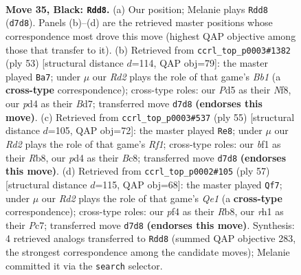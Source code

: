 \documentclass[11pt]{article}
\begin{document}
\clearpage

\begin{figure}[p]\centering
\begin{subfigure}{0.46\textwidth}\centering
\resizebox{\linewidth}{!}{%
\newchessgame
\chessboard[
  setfen={7r/pb1r1k1p/n1q3pP/1p1p1pP1/1b1P1P2/1P2P1N1/5K2/R2Q1BNR b - - 17 35},
  showmover=false,
  pgfstyle=straightmove, color=movearrow, markmove={d7-d8}
]}
\caption{}
\end{subfigure}\hfill
\begin{subfigure}{0.46\textwidth}\centering
\resizebox{\linewidth}{!}{%
\newchessgame
\chessboard[
  setfen={1b2rnk1/1pqb1p2/2p2pp1/p1P4p/P2PP2P/1Q3B2/1P2NKP1/3R3R b - - 1 27},
  showmover=false,
  pgfstyle=straightmove, color=movearrow, markmove={b8-a7}
]}
\caption{}
\end{subfigure}
\\[4pt]
\begin{subfigure}{0.46\textwidth}\centering
\resizebox{\linewidth}{!}{%
\newchessgame
\chessboard[
  setfen={1rb2r1k/2q3p1/2p2b1p/p3p1nP/P1B1Pp2/1P1N1P2/1BP1Q3/1K1R2R1 b - - 3 28},
  showmover=false,
  pgfstyle=straightmove, color=movearrow, markmove={f8-e8}
]}
\caption{}
\end{subfigure}\hfill
\begin{subfigure}{0.46\textwidth}\centering
\resizebox{\linewidth}{!}{%
\newchessgame
\chessboard[
  setfen={1r2q2k/2pn2rp/3bp1p1/pb1p2P1/p2P1PNQ/2P5/1PB3P1/R1B3KR b - - 11 29},
  showmover=false,
  pgfstyle=straightmove, color=movearrow, markmove={e8-f7}
]}
\caption{}
\end{subfigure}
\caption{\textbf{Move 35, Black: \texttt{Rdd8}.} (a) Our position; Melanie plays \texttt{Rdd8} (\texttt{d7d8}). Panels (b)--(d) are the retrieved master positions whose correspondence most drove this move (highest QAP objective among those that transfer to it). (b) Retrieved from \texttt{ccrl\_top\_p0003\#1382} (ply 53) [structural distance $d$=114, QAP obj=79]: the master played \texttt{Ba7}; under $\mu$ our \emph{Rd2} plays the role of that game's \emph{Bb1} (a \textbf{cross-type} correspondence); cross-type roles: our \emph{P}d5 as their \emph{N}f8, our \emph{p}d4 as their \emph{B}d7; transferred move \texttt{d7d8} \textbf{(endorses this move)}. (c) Retrieved from \texttt{ccrl\_top\_p0003\#537} (ply 55) [structural distance $d$=105, QAP obj=72]: the master played \texttt{Re8}; under $\mu$ our \emph{Rd2} plays the role of that game's \emph{Rf1}; cross-type roles: our \emph{b}f1 as their \emph{R}b8, our \emph{p}d4 as their \emph{B}c8; transferred move \texttt{d7d8} \textbf{(endorses this move)}. (d) Retrieved from \texttt{ccrl\_top\_p0002\#105} (ply 57) [structural distance $d$=115, QAP obj=68]: the master played \texttt{Qf7}; under $\mu$ our \emph{Rd2} plays the role of that game's \emph{Qe1} (a \textbf{cross-type} correspondence); cross-type roles: our \emph{p}f4 as their \emph{R}b8, our \emph{r}h1 as their \emph{P}c7; transferred move \texttt{d7d8} \textbf{(endorses this move)}. Synthesis: 4 retrieved analogs transferred to \texttt{Rdd8} (summed QAP objective 283, the strongest correspondence among the candidate moves); Melanie committed it via the \texttt{search} selector.}
\label{fig:thought-m69}
\end{figure}
\end{document}
